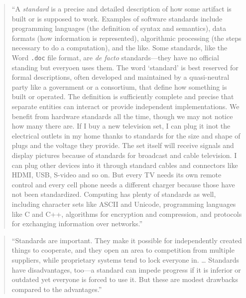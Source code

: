 \documentclass[]{tufte-book}
\begin{document}
\begin{quote}
``A \emph{standard} is a precise and detailed description of how some artifact is built
or is supposed to work. Examples of software standards include programming
languages (the definition of syntax and semantics), data formats (how information is
represented), algorithmic processing (the steps necessary to do a computation), and
the like. Some standards, like the Word \texttt{.doc} file format, are \emph{de facto} standards---they
have no official standing but everyoen uses them. The word `standard' is best reserved for
formal descriptions, often developed and maintained by a quasi-neutral party like a
government or a consortium, that define how something is built or operated. The definition
is sufficiently complete and precise that separate entities can interact or provide independent
implementations. We benefit from hardware standards all the time, though we may not notice
how many there are. If I buy a new television set, I can plug it inot the electrical outlets
in my home thanks to standards for the size and shape of plugs and the voltage they provide.
The set itself will receive signals and display pictures because of standards for broadcast
and cable television. I can plug other devices into it through standard cables and connectors
like HDMI, USB, S-video and so on. But every TV needs its own remote control and every cell
phone needs a different charger because those have not been standardized. Computing has plenty
of standards as well, including character sets like ASCII and Unicode, programming languages
like C and C++, algorithms for encryption and compression, and protocols for exchanging
information over networks.'' \citep{kernighan2011d}
\end{quote}

\begin{quote}
``Standards are important. They make it possible for independently created things to cooperate,
and they open an area to competition from multiple suppliers, while proprietary systems tend
to lock everyone in. \ldots{} Standards have disadvantages, too---a standard can impede progress if
it is inferior or outdated yet everyone is forced to use it. But these are modest drawbacks
compared to the advantages.'' \citep{kernighan2011d}
\end{quote}
\end{document}
